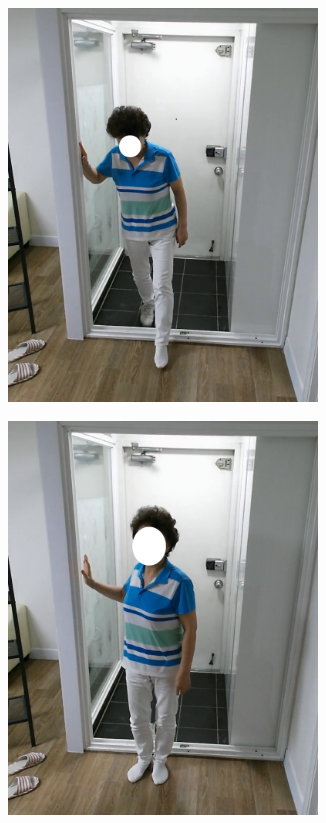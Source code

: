 \documentclass[thesis]{mas_proposal}
\begin{document}
\begin{figure}[htb!]
\begin{subfigure}[b]{0.22\textwidth}
		\subcaption{}%
		\label{subfig:left}
	\end{subfigure}
	\begin{subfigure}[b]{0.22\textwidth}
		\centering
		\includegraphics[width=0.9\textwidth]{images/dataset/3.png}
		\subcaption{}%
		\label{subfig:both_apart}
	\end{subfigure}
	\begin{subfigure}[b]{0.22\textwidth}
		\centering
		\includegraphics[width=0.9\textwidth]{images/dataset/4.png}

\end{subfigure}
\end{figure}
\end{document}
